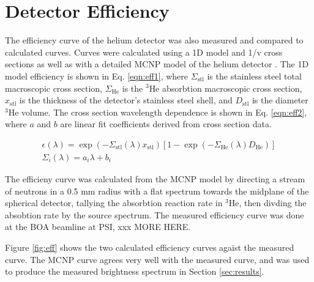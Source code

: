 \documentclass[preprint,12pt]{elsarticle}
\begin{document}
%
%
%
%
%


\section{Detector Efficiency}
\label{sec:eff}

The efficiency curve of the helium detector was also measured and compared to calculated curves.  Curves were calculated using a 1D model and 1/v cross sections as well as with a detailed MCNP model of the helium detector \cite{bonner_manual}.  The 1D model efficiency is shown in Eq. \ref{eqn:eff1}, where $\Sigma_{\textrm{stl}}$ is the stainless steel total macroscopic cross section, $\Sigma_{\textrm{He}}$ is the $^3$He absorbtion macroscopic cross section, $x_{\textrm{stl}}$ is the thickness of the detector's stainless steel shell, and  $D_{\textrm{stl}}$ is the diameter $^3$He volume.  The cross section wavelength dependence is shown in Eq. \ref{eqn:eff2}, where $a$ and $b$ are linear fit coefficients derived from cross section data.  

\begin{gather}
     \label{eqn:eff1} \epsilon(\lambda) = \exp \left(-\Sigma_{\textrm{stl}}(\lambda) x_{\textrm{stl}}\right)[1-\exp(-\Sigma_{\textrm{He}}(\lambda) D_{\textrm{He}})] \\
     \label{eqn:eff2} \Sigma_i(\lambda) = a_i\lambda+b_i
\end{gather}

The efficieny curve was calculated from the MCNP model by directing a stream of neutrons in a 0.5 mm radius with a flat spectrum towards the midplane of the spherical detector, tallying the absorbtion reaction rate in $^{3}$He, then divding the absobtion rate by the source spectrum.  The measured efficiency curve was done at the BOA beamline at PSI, xxx MORE HERE.

Figure \ref{fig:eff} shows the two calculated efficiency curves agaist the measured curve.  The MCNP curve agrees very well with the measured curve, and was used to produce the measured brightness spectrum in Section \ref{sec:results}.
\end{document}

